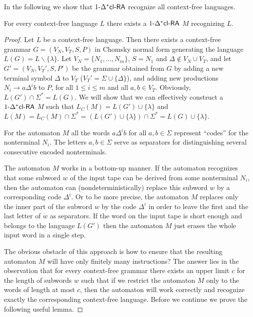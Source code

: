 In the following we show that $\kDXclRA[1]$ recognize all context-free languages.

\begin{theorem}\label{theorem:CFLsubseteqDXclRA}
For every context-free language $L$ there exists a $\kDXclRA[1]$ $M$ recognizing $L$.
\end{theorem}

\begin{proof}
Let $L$ be a context-free language. Then there exists a context-free grammar $G = (V_N, V_T, S, P)$ in Chomsky normal form generating the language $L(G) = L \smallsetminus \{\lambda\}$. Let $V_N = \{N_1, \ldots, N_m\}$, $S = N_1$ and $\Delta \not\in V_N \cup V_T$, and let $G' = (V_N, V_T', S, P')$ be the grammar obtained from $G$ by adding a new terminal symbol $\Delta$ to $V_T$ ($V_T'=\Sigma \cup \{\Delta\}$), and adding new productions $N_i \to a \Delta^i b$ to $P$, for all $1 \le i \le m$ and all $a, b \in V_T$. Obviously, $L(G') \cap \Sigma^* = L(G)$. We will show that we can effectively construct a $\kDXclRA[1]$ $M$ such that $L_C(M) = L(G') \cup \{ \lambda \}$ and $L(M) = L_C(M) \cap \Sigma^* = (L(G') \cup \{ \lambda \}) \cap \Sigma^* = L(G) \cup \{ \lambda \}$.

For the automaton $M$ all the words $a \Delta^i b$ for all $a, b \in \Sigma$ represent ``codes'' for the nonterminal $N_i$. The letters $a, b \in \Sigma$ serve as separators for distinguishing several consecutive encoded nonterminals.

The automaton $M$ works in a bottom-up manner. If the automaton recognizes that some subword $w$ of the input tape can be derived from some nonterminal $N_i$, then the automaton can (nondeterministically) replace this subword $w$ by a corresponding code $\Delta^i$. Or to be more precise, the automaton $M$ replaces only the inner part of the subword $w$ by the code $\Delta^i$ in order to leave the first and the last letter of $w$ as separators. If the word on the input tape is short enough and  belongs to the language $L(G')$ then the automaton $M$ just erases the whole input word in a single step.

The obvious obstacle of this approach is how to ensure that the resulting automaton $M$ will have only finitely many instructions? The answer lies in the observation that for every context-free grammar there exists an upper limit $c$ for the length of subwords $w$ such that if we restrict the automaton $M$ only to the words of length at most $c$, then the automaton will work correctly and recognize exactly the corresponding context-free language. Before we continue we prove the following useful lemma.


\end{proof}
